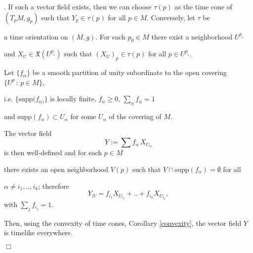 . If such a vector field exists, then we can choose $\tau(p)$ as the time cone of $(T_pM,g_p)$ such that $Y_p\in \tau(p)$ for all $p\in M$. Conversely, let $\tau$ be

a time orientation on $(M,g)$. For each $p_0 \in M$ there exist a neighborhood $U^{p_{_0}}$

and $X_U\in \mathfrak{X}(U^{p_{_0}})$ such that $(X_U)_p \in \tau(p)$ for all $p\in U^{p_{_0}}$.

Let $\{f_{\alpha}\}$ be a smooth partition of unity subordinate to the open covering $\{U^p\, : \, p\in M\}$,

i.e. $\{\mathrm{supp}(f_{\alpha)}\}$ is locally finite, $f_{\alpha}\geq 0$, $\sum_{\alpha} f_{\alpha}=1$

and  $\mathrm{supp}(f_{\alpha}) \subset U_{\alpha}$ for some $U_{\alpha}$ of the covering of $M$.

The vector field $$Y:=\sum f_{\alpha}\, X_{U_{\alpha}}$$ is then well-defined and for each $p\in M$

there exists an open neighborhood $V(p)$ such that $V \cap \mathrm{supp}(f_{\alpha}) = \emptyset$ for all

$\alpha \neq i_1,..,i_k$; therefore $$Y_{\mid V}=f_{i_1}X_{U_{i_1}}+..+f_{i_k}X_{U_{i_k}},$$ with $\sum_j f_{i_j}=1$.

Then, using the convexity of time cones, Corollary \ref{convexity}, the vector field $Y$ is timelike everywhere.

\hfill{$\Box$}


